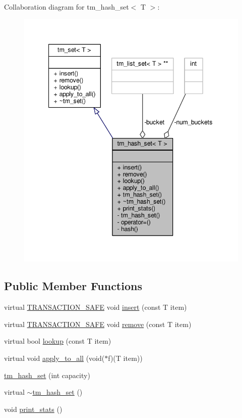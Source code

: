 Collaboration diagram for tm\-\_\-hash\-\_\-set$<$ T $>$\-:
\nopagebreak
\begin{figure}[H]
\begin{center}
\leavevmode
\includegraphics[width=343pt]{classtm__hash__set__coll__graph}
\end{center}
\end{figure}
\subsection*{Public Member Functions}
\begin{DoxyCompactItemize}
\item 
virtual \hyperlink{common_8hpp_a77872cb9748b204f4b1c44ba6141b862}{T\-R\-A\-N\-S\-A\-C\-T\-I\-O\-N\-\_\-\-S\-A\-F\-E} void \hyperlink{classtm__hash__set_ae953be9e3f84496324247d026973977e}{insert} (const T item)
\item 
virtual \hyperlink{common_8hpp_a77872cb9748b204f4b1c44ba6141b862}{T\-R\-A\-N\-S\-A\-C\-T\-I\-O\-N\-\_\-\-S\-A\-F\-E} void \hyperlink{classtm__hash__set_a1509ba92e7be69a82bb43d2198119b08}{remove} (const T item)
\item 
virtual bool \hyperlink{classtm__hash__set_a8951d8abc33cec22051de7168a84ee3e}{lookup} (const T item)
\item 
virtual void \hyperlink{classtm__hash__set_a8ae116cb73411f6179cecc03ad3f6f50}{apply\-\_\-to\-\_\-all} (void($\ast$f)(T item))
\item 
\hyperlink{classtm__hash__set_abe2f2105cf2f4afbc44f861c8b48cdbf}{tm\-\_\-hash\-\_\-set} (int capacity)
\item 
virtual \hyperlink{classtm__hash__set_a83556069a6e3da6da9955ad25d4c7fba}{$\sim$tm\-\_\-hash\-\_\-set} ()
\item 
void \hyperlink{classtm__hash__set_afb1d25abd0ab870bb94ca41133a64e1c}{print\-\_\-stats} ()
\end{DoxyCompactItemize}
